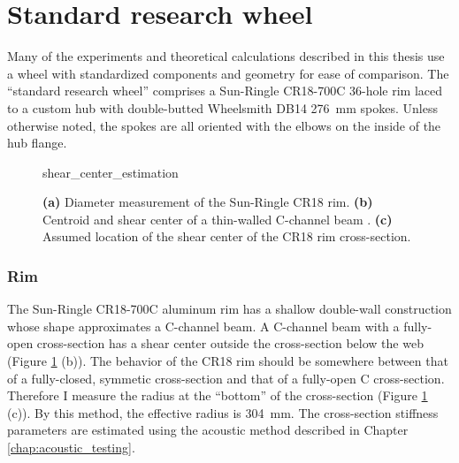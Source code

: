 \documentclass[../../thesis.tex]{subfiles}
\begin{document}
\section{Standard research wheel}
\label{app:std_research_wheel}

Many of the experiments and theoretical calculations described in this thesis use a wheel with standardized components and geometry for ease of comparison. The ``standard research wheel'' comprises a Sun-Ringle CR18-700C 36-hole rim laced to a custom hub with double-butted Wheelsmith DB14 \SI{276}{mm} spokes. Unless otherwise noted, the spokes are all oriented with the elbows on the inside of the hub flange.

\begin{figure}[h]
\centering
{shear_center_estimation}
\caption{\textbf{(a)} Diameter measurement of the Sun-Ringle CR18 rim. \textbf{(b)} Centroid and shear center of a thin-walled C-channel beam \cite{Timoshenko1961}. \textbf{(c)} Assumed location of the shear center of the CR18 rim cross-section.}
\label{fig:shear_center_estimation}
\end{figure}

\subsubsection*{Rim}

The Sun-Ringle CR18-700C aluminum rim has a shallow double-wall construction whose shape approximates a C-channel beam. A C-channel beam with a fully-open cross-section has a shear center outside the cross-section below the web \cite{Timoshenko1961} (Figure \ref{fig:shear_center_estimation} (b)). The behavior of the CR18 rim should be somewhere between that of a fully-closed, symmetic cross-section and that of a fully-open C cross-section. Therefore I measure the radius at the ``bottom'' of the cross-section (Figure \ref{fig:shear_center_estimation} (c)). By this method, the effective radius is \SI{304}{mm}. The cross-section stiffness parameters are estimated using the acoustic method described in Chapter \ref{chap:acoustic_testing}.
\end{document}
